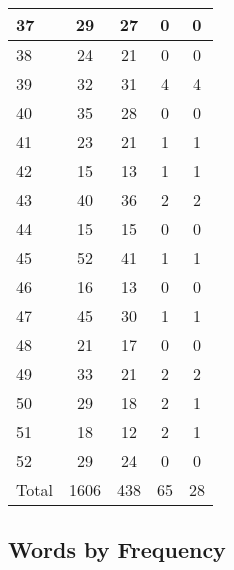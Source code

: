 \begin{center}
\begin{longtable}{l|c|c|c|c}
37 & 29 & 27 & 0 & 0\\ \hline
38 & 24 & 21 & 0 & 0\\ \hline
39 & 32 & 31 & 4 & 4\\ \hline
40 & 35 & 28 & 0 & 0\\ \hline
41 & 23 & 21 & 1 & 1\\ \hline
42 & 15 & 13 & 1 & 1\\ \hline
43 & 40 & 36 & 2 & 2\\ \hline
44 & 15 & 15 & 0 & 0\\ \hline
45 & 52 & 41 & 1 & 1\\ \hline
46 & 16 & 13 & 0 & 0\\ \hline
47 & 45 & 30 & 1 & 1\\ \hline
48 & 21 & 17 & 0 & 0\\ \hline
49 & 33 & 21 & 2 & 2\\ \hline
50 & 29 & 18 & 2 & 1\\ \hline
51 & 18 & 12 & 2 & 1\\ \hline
52 & 29 & 24 & 0 & 0\\ \hline
\hline \hline
Total & 1606 & 438 & 65 & 28



\end{longtable}
\end{center}

 
\subsection{Words by Frequency}

